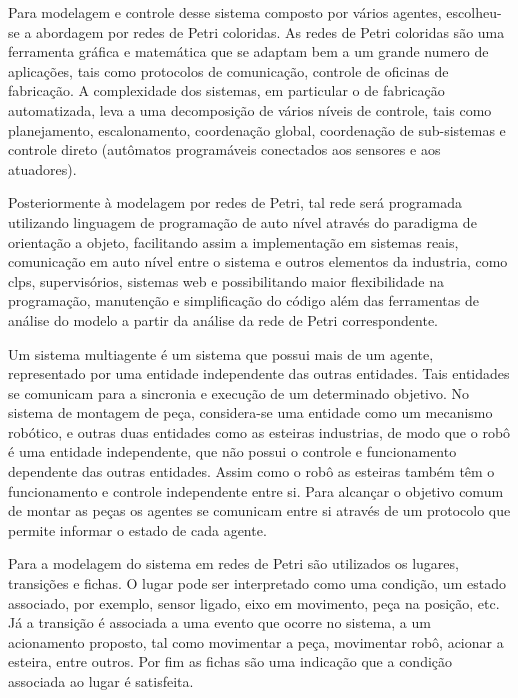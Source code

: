 Para modelagem e controle desse sistema composto por vários agentes, escolheu-se a abordagem por redes de Petri coloridas. As redes de Petri  coloridas são uma ferramenta gráfica e matemática que se adaptam bem a um grande numero de aplicações, tais como protocolos de comunicação, controle de oficinas de fabricação. 
A complexidade dos sistemas, em particular o de fabricação automatizada, leva a uma decomposição de vários níveis de controle, tais como planejamento, escalonamento, coordenação global, coordenação de sub-sistemas e controle direto (autômatos programáveis conectados aos sensores e aos atuadores). \cite{vallete}

Posteriormente à modelagem por redes de Petri, tal rede será programada utilizando linguagem de programação de auto nível através do paradigma de orientação a objeto, facilitando assim a implementação em sistemas reais, comunicação em auto nível entre o sistema e outros elementos da industria, como clps, supervisórios, sistemas web e possibilitando maior flexibilidade na programação, manutenção e simplificação do código além das ferramentas de análise do modelo a partir da análise da rede de Petri correspondente.

Um sistema multiagente é um sistema que possui mais de um agente, representado por uma entidade independente das outras entidades. Tais entidades se comunicam para a sincronia e execução de um determinado objetivo. No sistema de montagem de peça, considera-se uma entidade como um mecanismo robótico, e outras duas entidades como as esteiras industrias, de modo que o robô é uma entidade independente, que não possui o controle e funcionamento dependente das outras entidades. Assim como o robô as esteiras também têm o funcionamento e controle independente entre si. Para alcançar o objetivo comum de montar as peças os agentes se comunicam entre si através de um protocolo que permite informar o estado de cada agente.

Para a modelagem do sistema em redes de Petri são utilizados os lugares, transições e fichas. O lugar pode ser interpretado como uma condição, um estado associado, por exemplo, sensor ligado, eixo em movimento, peça na posição, etc. Já a transição é associada a uma evento que ocorre no sistema, a um acionamento proposto, tal como movimentar a peça, movimentar robô, acionar a esteira, entre outros. Por fim as fichas são uma indicação que a condição associada ao lugar é satisfeita.


